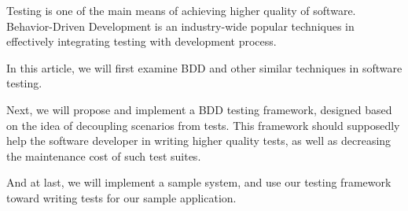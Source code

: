 Testing is one of the main means of achieving higher quality of software. Behavior-Driven Development is an industry-wide popular techniques in effectively integrating testing with development process.

In this article, we will first examine BDD and other similar techniques in software testing.

Next, we will propose and implement a BDD testing framework, designed based on the idea of decoupling scenarios from tests. This framework should supposedly help the software developer in writing higher quality tests, as well as decreasing the maintenance cost of such test suites.

And at last, we will implement a sample system, and use our testing framework toward writing tests for our sample application.

